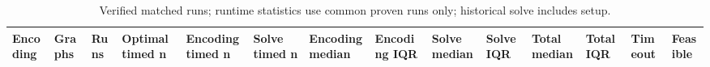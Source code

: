 \begin{table}[htbp]
\centering
\caption{Verified matched runs; runtime statistics use common proven runs only; historical solve includes setup.}
\label{tab:p1-Repeated-summary}
\begin{tabular}{llllllllllllll}
\hline
Encoding & Graphs & Runs & Optimal timed n & Encoding timed n & Solve timed n & Encoding median & Encoding IQR & Solve median & Solve IQR & Total median & Total IQR & Timeout & Feasible \\
\hline
\hline
\end{tabular}
\end{table}
